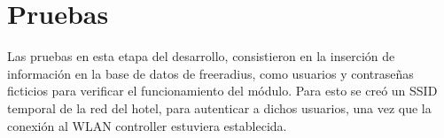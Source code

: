 \section{Pruebas}
		Las pruebas en esta etapa del desarrollo, consistieron en la inserción de información en la base de datos de freeradius, como usuarios y contraseñas ficticios para verificar el funcionamiento del módulo. Para esto se creó un SSID temporal de la red del hotel, para autenticar a dichos usuarios, una vez que la conexión al WLAN controller estuviera establecida.